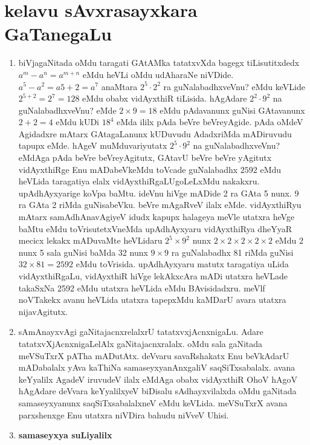 \chapter{kelavu sAvxrasayxkara GaTanegaLu}

\begin{enumerate}[\rm 1]
\item biVjagaNitada oMdu taragati GAtAMka tatatxvXda bagegx tiLisutitxdedx $a^m-a^n=a^{m+n}$ eMdu heVLi oMdu udAharaNe niVDide. $a^5-a^2=a{5+2}=a^7$ anaMtara $2^5\cdot 2^2$ ra guNalabadhxveVnu? eMdu keVLide $2^{5+2}=2^7=128$ eMdu obabx vidAyxthiR tiLisida. hAgAdare $2^2\cdot 9^2$ na guNalabadhxveVnu? eMde $2\times 9=18$ eMdu pAdavanunx guNisi GAtavanunx $2+2=4$ eMdu kUDi $18^4$ eMda ililx pAda beVre beVreyAgide. pAda oMdeV Agidadxre mAtarx GAtagaLanunx kUDuvudu AdadxriMda mADiruvudu tapupx eMde. hAgeV muMduvariyutatx $2^5\cdot 9^2$ na guNalabadhxveVnu? eMdAga pAda beVre beVreyAgitutx, GAtavU beVre beVre yAgitutx vidAyxthiRge Enu mADabeVkeMdu toVcade guNalabadhx $2592$ eMdu heVLida taragatiya elalx vidAyxthiRgaLUgoLeLxMdu nakakxru. upAdhAyxyarige koVpa baMtu. ideVnu hiVge mADide {\rm 2} ra GAta {\rm 5} nunx. {\rm 9} ra GAta {\rm 2} riMda guNisabeVku. beVre mAgaRveV ilalx eMde. vidAyxthiRyu mAtarx samAdhAnavAgiyeV idudx kapupx halageya meVle utatxra heVge baMtu eMdu toVrisutetxVneMda upAdhAyxyaru vidAyxthiRya dheYyaR mecicx lekakx mADuvaMte heVLidaru $2^5\times 9^2$ nunx $2\times 2\times 2\times 2\times 2$ eMdu {\rm 2} nunx {\rm 5} sala guNisi baMda {\rm 32} nunx $9\times 9$ ra guNalabadhx {\rm 81} riMda guNisi $32\times 81=2592$ eMdu toVrisida. upAdhAyxyaru matutx taragatiya uLida vidAyxthiRgaLu, vidAyxthiR hiVge lekAkxcAra mADi utatxra heVLade takaSxNa {\rm 2592} eMdu utatxra heVLida eMdu BAvisidadxru. meVlf noVTakekx avanu heVLida utatxra tapepxMdu kaMDarU avara utatxra nijavAgitutx.

\item sAmAnayxvAgi gaNitajacnxrelalxrU tatatxvxjAcnxnigaLu. Adare tatatxvXjAcnxnigaLelAlx gaNitajacnxralalx. oMdu sala gaNitada meVSuTxrX pATha mADutAtx. deVvaru savaRshakatx Enu beVkAdarU mADabalalx yAva kaThiNa samaseyxyanAnxgaliV saqSiTxsabalalx. avana keYyalilx AgadeV iruvudeV ilalx eMdAga obabx vidAyxthiR OhoV hAgoV hAgAdare deVvara keYyalilxyeV biDisalu sAdhayxvilalxda oMdu gaNitada samaseyxyanunx saqSiTxsabalalxneV eMdu keVLida. meVSuTxrX avana parxshenxge Enu utatxra niVDira bahudu niVveV Uhisi.

\item \textbf{samaseyxya suLiyalilx}


\end{enumerate}
